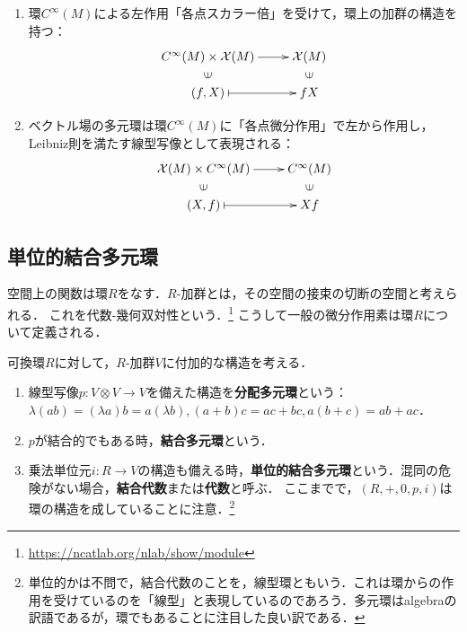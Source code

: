 \documentclass[uplatex,dvipdfmx]{jsreport}
\begin{document}
\begin{definition}[ベクトル場の演算]\mbox{}
    \begin{enumerate}
        \item 環$C^\infty(M)$による左作用「各点スカラー倍」を受けて，環上の加群の構造を持つ：
        \[\xymatrix@R-2pc{
            C^\infty(M)\times\X(M)\ar[r]&\X(M)\\
            \rotatebox[origin=c]{90}{$\in$}&\rotatebox[origin=c]{90}{$\in$}\\
            (f,X)\ar@{|->}[r]&fX
        }\]
        \item ベクトル場の多元環は環$C^\infty(M)$に「各点微分作用」で左から作用し，Leibniz則を満たす線型写像として表現される：
        \[\xymatrix@R-2pc{
            \X(M)\times C^\infty(M)\ar[r]&C^\infty(M)\\
            \rotatebox[origin=c]{90}{$\in$}&\rotatebox[origin=c]{90}{$\in$}\\
            (X,f)\ar@{|->}[r]&Xf
        }\]
    \end{enumerate}
\end{definition}

\subsection{単位的結合多元環}

\begin{tcolorbox}[colframe=ForestGreen, colback=ForestGreen!10!white,breakable,colbacktitle=ForestGreen!40!white,coltitle=black,fonttitle=\bfseries\sffamily,
title=代数学と幾何学]
    空間上の関数は環$R$をなす．$R$-加群とは，その空間の接束の切断の空間と考えられる．
    これを代数-幾何双対性という．\footnote{\url{https://ncatlab.org/nlab/show/module}}
    こうして一般の微分作用素は環$R$について定義される．
\end{tcolorbox}

\begin{definition}
    可換環$R$に対して，$R$-加群$V$に付加的な構造を考える．
    \begin{enumerate}
        \item 線型写像$p:V\otimes V\to V$を備えた構造を\textbf{分配多元環}という：$\lambda(ab)=(\lambda a)b=a(\lambda b), (a+b)c=ac+bc, a(b+c)=ab+ac$．
        \item $p$が結合的でもある時，\textbf{結合多元環}という．
        \item 乗法単位元$i:R\to V$の構造も備える時，\textbf{単位的結合多元環}という．混同の危険がない場合，\textbf{結合代数}または\textbf{代数}と呼ぶ．
        ここまでで，$(R,+,0,p,i)$は環の構造を成していることに注意．\footnote{単位的かは不問で，結合代数のことを，線型環ともいう．これは環からの作用を受けているのを「線型」と表現しているのであろう．多元環はalgebraの訳語であるが，環でもあることに注目した良い訳である．}
    \end{enumerate}
\end{definition}
\end{document}
